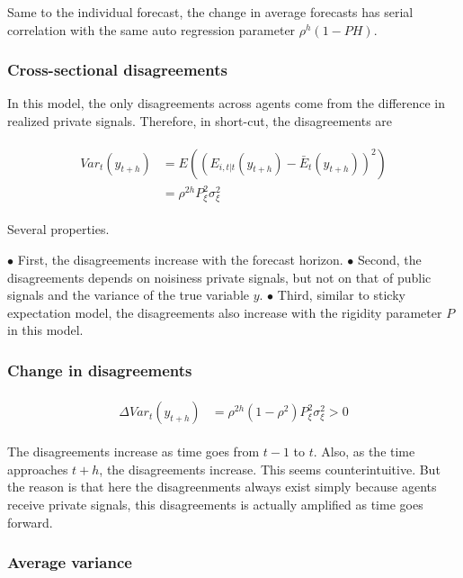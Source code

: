 \documentclass[]{article}
\begin{document}
Same to the individual forecast, the change in average forecasts has serial correlation with the same auto regression parameter $\rho^h(1-PH)$.  

\subsubsection{Cross-sectional disagreements}

In this model, the only disagreements across agents come from the difference in realized private signals. Therefore, in short-cut, the disagreements are 

\begin{eqnarray}
\begin{aligned}
Var_t(y_{t+h}) & = E((E_{i,t|t}(y_{t+h}) - \bar E_t(y_{t+h}))^2) \\
& = \rho^{2h} P^2_\xi \sigma^2_\xi  
\end{aligned}
\end{eqnarray}


Several properties. 

$\bullet$ First, the disagreements increase with the forecast horizon. 
$\bullet$  Second, the disagreements depends on noisiness private signals, but not on that of public signals and the variance of the true variable $y$. 
$\bullet$  Third, similar to sticky expectation model, the disagreements also increase with the rigidity parameter $P$ in this model.

\subsubsection{Change in disagreements}


\begin{eqnarray}
\begin{aligned}
\Delta Var_t(y_{t+h}) & = \rho^{2h}(1-\rho^2) P^2_\xi \sigma^2_\xi >0
\end{aligned}
\end{eqnarray}

The disagreements increase as time goes from $t-1$ to $t$. Also, as the time approaches $t+h$, the disagreements increase. This seems counterintuitive. But the reason is that here the disagreenments always exist simply because agents receive private signals, this disagreements is actually amplified as time goes forward. 

\subsubsection{Average variance}
\end{document}
